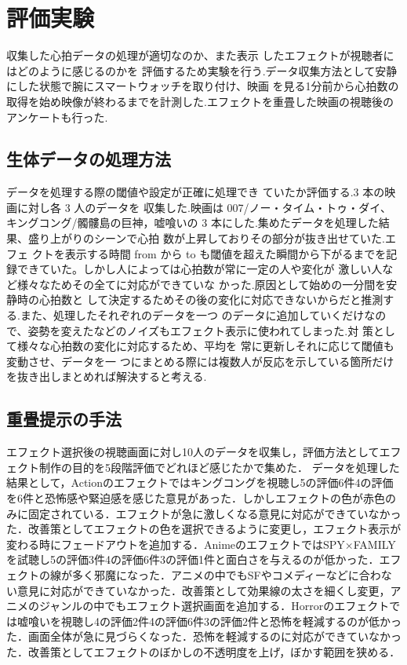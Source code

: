 \thispagestyle{myheadings}
\chapter{評価実験}

収集した心拍データの処理が適切なのか、また表示 したエフェクトが視聴者にはどのように感じるのかを 評価するため実験を行う.データ収集方法として安静 にした状態で腕にスマートウォッチを取り付け、映画 を見る1分前から心拍数の取得を始め映像が終わるまでを計測した.エフェクトを重畳した映画の視聴後のアンケートも行った. 

\section{生体データの処理方法}
データを処理する際の閾値や設定が正確に処理でき ていたか評価する.3 本の映画に対し各 3 人のデータを 収集した.映画は 007/ノー・タイム・トゥ・ダイ、キングコング/髑髏島の巨神，嘘喰いの 3 本にした.集めたデータを処理した結果、盛り上がりのシーンで心拍 数が上昇しておりその部分が抜き出せていた.エフェ クトを表示する時間 from から to も閾値を超えた瞬間から下がるまでを記録できていた。しかし人によっては心拍数が常に一定の人や変化が 激しい人など様々なためその全てに対応ができていな かった.原因として始めの一分間を安静時の心拍数と して決定するためその後の変化に対応できないからだと推測する.また、処理したそれぞれのデータを一つ のデータに追加していくだけなので、姿勢を変えたなどのノイズもエフェクト表示に使われてしまった.対 策として様々な心拍数の変化に対応するため、平均を 常に更新しそれに応じて閾値も変動させ、データを一 つにまとめる際には複数人が反応を示している箇所だけを抜き出しまとめれば解決すると考える. 

\section{重畳提示の手法}
エフェクト選択後の視聴画面に対し10人のデータを収集し，評価方法としてエフェクト制作の目的を5段階評価でどれほど感じたかで集めた．
データを処理した結果として，Actionのエフェクトではキングコングを視聴し5の評価6件4の評価を6件と恐怖感や緊迫感を感じた意見があった．しかしエフェクトの色が赤色のみに固定されている．エフェクトが急に激しくなる意見に対応ができていなかった．改善策としてエフェクトの色を選択できるように変更し，エフェクト表示が変わる時にフェードアウトを追加する．AnimeのエフェクトではSPY×FAMILYを試聴し5の評価3件4の評価6件3の評価1件と面白さを与えるのが低かった．エフェクトの線が多く邪魔になった．アニメの中でもSFやコメディーなどに合わない意見に対応ができていなかった．改善策として効果線の太さを細くし変更，アニメのジャンルの中でもエフェクト選択画面を追加する．Horrorのエフェクトでは嘘喰いを視聴し4の評価2件4の評価6件3の評価2件と恐怖を軽減するのが低かった．画面全体が急に見づらくなった．恐怖を軽減するのに対応ができていなかった．改善策としてエフェクトのぼかしの不透明度を上げ，ぼかす範囲を狭める．

